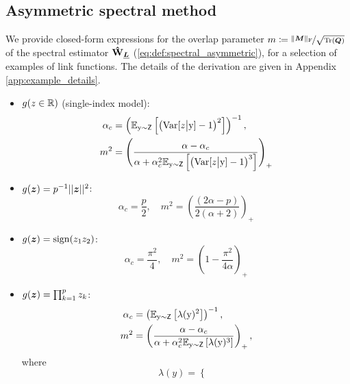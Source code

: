 \subsection{Asymmetric spectral method}\label{sec:examples_asymmetric}
We provide closed-form expressions for the overlap parameter $m \coloneqq \nicefrac{ \|{\boldsymbol M} \|_{\mathrm{F}} }{\sqrt{{\rm Tr}({\boldsymbol Q})}}$ of the spectral estimator $\boldsymbol{\mathbf{\hat{W}}}_{{\underline{\bm{L}}}}$ (\ref{eq:def:spectral_asymmetric}), for a selection of examples of link functions. The details of the derivation are given in Appendix \ref{app:example_details}.
\begin{itemize}[leftmargin=2em,wide=1pt]
    \item $g(z\in\mathbb{R})$ (single-index model):
    \begin{align}
        \alpha_c &= \left(\mathbb{E}_{{ \mathrm{y} }\sim\mathsf{Z}}\left[\left(\text{Var}[z\big|{ \mathrm{y} }] - 1\right)^2\right]\right)^{-1},\\
        m^2 &= \Bigg(\frac{\alpha - \alpha_c}{\alpha + \alpha_c^2\mathbb{E}_{{ \mathrm{y} }\sim\mathsf{Z}}\left[\left(\text{Var}[z\big|{ \mathrm{y} }] - 1\right)^3\right]}\Bigg)_+
    \end{align}
    \item $g({\boldsymbol z}) = p^{-1}||{\boldsymbol z}||^2$:
    \begin{equation}\label{eq:overlap_asymmetric_squares}
        \alpha_c = \frac{p}{2},\quad m^2 = \left(\frac{(2\alpha-p)}{2(\alpha+2)}\right)_+
    \end{equation}
    \item $g({\boldsymbol z}) = \operatorname{sign}(z_1z_2)$: 
    \begin{equation}
        \alpha_c = \frac{\pi^2}{4},\quad m^2 = \left(1-\frac{\pi^2}{4\alpha}\right)_+
    \end{equation}
    \item $g({\boldsymbol z}) = \prod_{k=1}^pz_k$:
   \begin{align}\label{eq:overlap_prod_zk}
        \alpha_c &= \left(\mathbb{E}_{{ \mathrm{y} }\sim\mathsf{Z}}\left[\lambda({ \mathrm{y} })^2\right]\right)^{-1},\\
        m^2 &= \left(\frac{\alpha - \alpha_c}{\alpha + \alpha_c^2\mathbb{E}_{{ \mathrm{y} }\sim\mathsf{Z}}\left[\lambda({ \mathrm{y} })^3\right]}\right)_+,
    \end{align}
    where
    \begin{equation}\label{eq:lambda_prod_zk}
        \lambda(y) = \begin{cases}

\end{cases}
\end{equation}
\end{itemize}
